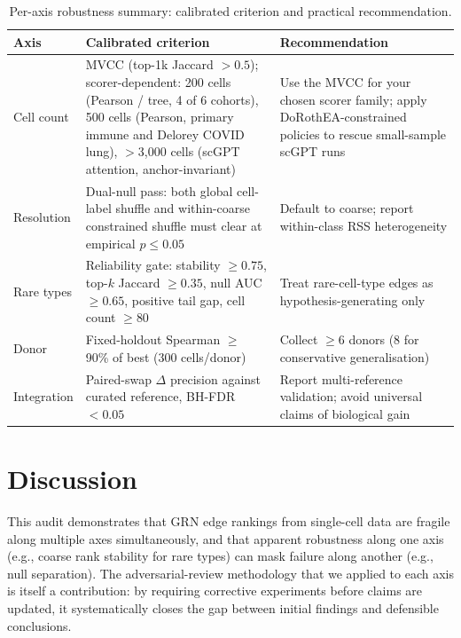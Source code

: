 \documentclass[12pt]{article}
\providecommand{\DIFaddbegin}{} %
\providecommand{\DIFaddend}{} %
\providecommand{\DIFdelend}{} %
\begin{document}
\DIFdelend \DIFaddbegin \begin{table}[ht]
\centering
\caption{Per-axis robustness summary: calibrated criterion and practical recommendation.}
\label{tab:fragility}
\small
\begin{tabularx}{\textwidth}{@{}l X X@{}}
\toprule
\textbf{Axis} & \textbf{Calibrated criterion} & \textbf{Recommendation} \\
\midrule
Cell count   & MVCC (top-1k Jaccard $>0.5$); scorer-dependent: 200 cells (Pearson / tree, 4 of 6 cohorts), 500 cells (Pearson, primary immune and Delorey COVID lung), $>$3{,}000 cells (scGPT attention, anchor-invariant) & Use the MVCC for your chosen scorer family; apply DoRothEA-constrained policies to rescue small-sample scGPT runs \\
\addlinespace
Resolution   & Dual-null pass: both global cell-label shuffle and within-coarse constrained shuffle must clear at empirical $p \leq 0.05$ & Default to coarse; report within-class RSS heterogeneity \\
\addlinespace
Rare types   & Reliability gate: stability $\geq 0.75$, top-$k$ Jaccard $\geq 0.35$, null AUC $\geq 0.65$, positive tail gap, cell count $\geq 80$ & Treat rare-cell-type edges as hypothesis-generating only \\
\addlinespace
Donor        & Fixed-holdout Spearman $\geq$ 90\% of best (300 cells/donor) & Collect $\geq 6$ donors (8 for conservative generalisation) \\
\addlinespace
Integration  & Paired-swap $\Delta$ precision against curated reference, BH-FDR $<0.05$ & Report multi-reference validation; avoid universal claims of biological gain \\
\bottomrule
\end{tabularx}
\end{table}
\DIFaddend 

\section{Discussion}

This audit demonstrates that GRN edge rankings from single-cell data are fragile
along multiple axes simultaneously, and that apparent robustness along one axis
(e.g., coarse rank stability for rare types) can mask failure along another
(e.g., null separation). The adversarial-review methodology that we applied to
each axis is itself a contribution: by requiring corrective experiments before
claims are updated, it systematically closes the gap between initial findings and
defensible conclusions.
\end{document}
